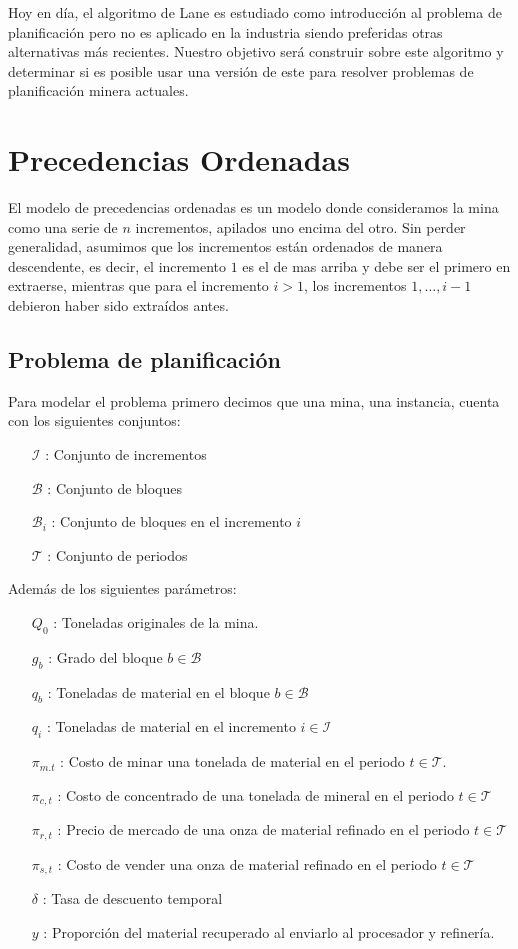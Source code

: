 \documentclass[12pt,letterpaper]{article}
\newcommand\mB{\mathcal{B}}
\newcommand\mI{\mathcal{I}}
\newcommand\mT{\mathcal{T}}
\begin{document}
Hoy en día, el algoritmo de Lane es estudiado como introducción al problema de planificación pero no es aplicado en la industria siendo preferidas otras alternativas más recientes.
Nuestro objetivo será construir sobre este algoritmo y determinar si es posible usar una versión de este para resolver problemas de planificación minera actuales.
%  
\section{Precedencias Ordenadas}
El modelo de precedencias ordenadas es un modelo donde consideramos la mina como una serie de $n$ incrementos, apilados uno encima del otro. Sin perder generalidad, asumimos que los incrementos están ordenados de manera descendente, es decir, el incremento $1$ es el de mas arriba y debe ser el primero en extraerse, mientras que para el incremento $i > 1$, los incrementos $1,\dotsc,i-1$ debieron haber sido extraídos antes.  

\subsection{Problema de planificación}
Para modelar el problema primero decimos que una mina, una instancia, cuenta con los siguientes conjuntos:
\begin{itemize}
    \item[$\mI$] : Conjunto de incrementos
    \item[$\mB$] : Conjunto de bloques
    \item[$\mB_i$] : Conjunto de bloques en el incremento $i$
    \item[$\mT$] : Conjunto de periodos 
\end{itemize}
Además de los siguientes parámetros:
\begin{itemize}
    \item[$Q_0$] : Toneladas originales de la mina.
    \item[$g_b$] : Grado del bloque $b\in \mB$
    \item[$q_b$] : Toneladas de material en el bloque $b\in\mB$
    \item[$q_i$] : Toneladas de material en el incremento $i\in\mI$
    \item[$\pi_{m.t}$] : Costo de minar una tonelada de material en el periodo $t\in\mT$.
    \item[$\pi_{c,t}$] : Costo de concentrado de una tonelada de mineral en el periodo $t\in\mT$
    \item[$\pi_{r,t}$] : Precio de mercado de una onza de material refinado en el periodo $t\in\mT$
    \item[$\pi_{s,t}$] : Costo de vender una onza de material refinado en el periodo $t\in\mT$
    \item[$\delta$] : Tasa de descuento temporal
    \item[$y$] : Proporción del material recuperado al enviarlo al procesador y refinería.
\end{itemize}
\end{document}
